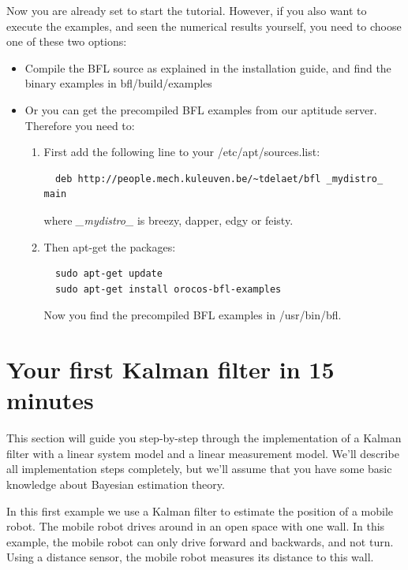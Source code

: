 \documentclass[a4paper,10pt]{report}
\begin{document}
Now you are already set to start the tutorial. However, if you also
want to execute the examples, and seen the numerical results yourself,
you need to choose one of these two options:
\begin{itemize}
\item Compile the BFL source as explained in the installation guide,
  and find the binary examples in bfl/build/examples
\item Or you can get the precompiled BFL examples from our aptitude
  server. Therefore you need to:\
\begin{enumerate}
\item First add the following line to your /etc/apt/sources.list:
\begin{verbatim}
  deb http://people.mech.kuleuven.be/~tdelaet/bfl _mydistro_ main
\end{verbatim}
  where \emph{\_mydistro\_} is breezy, dapper, edgy or feisty.
\item Then apt-get the packages:
\begin{verbatim}
  sudo apt-get update
  sudo apt-get install orocos-bfl-examples
\end{verbatim}
Now you find the precompiled BFL examples in /usr/bin/bfl.
\end{enumerate}
\end{itemize}






\pagebreak
\section{Your first Kalman filter in 15 minutes}
This section will guide you step-by-step through the implementation of
a Kalman filter with a linear system model and a linear measurement
model. We'll describe all implementation steps completely, but we'll
assume that you have some basic knowledge about Bayesian estimation
theory.

In this first example we use a Kalman filter to estimate the position
of a mobile robot. The mobile robot drives around in an open space
with one wall. In this example, the mobile robot can only drive
forward and backwards, and not turn. Using a distance sensor, the
mobile robot measures its distance to this wall.
\end{document}
